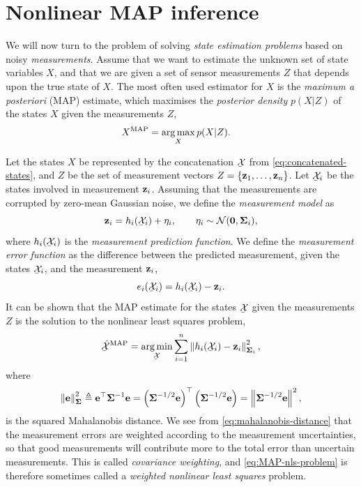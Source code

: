 \begin{example}[frametitle=Range-based localisation]
\end{example}

\section{Nonlinear MAP inference}
We will now turn to the problem of solving \emph{state estimation problems} based on noisy \emph{measurements}.
Assume that we want to estimate the unknown set of state variables $X$, and that we are given a set of sensor measurements $Z$ that depends upon the true state of $X$.
The most often used estimator for $X$ is the \emph{maximum a posteriori} (MAP) estimate, which maximises the \emph{posterior density} $p(X | Z)$ of the states $X$ given the measurements $Z$,
\begin{align} \label{eq:MAP}
    X^\text{MAP} &= \operatorname*{arg\,max}_X p(X | Z).
\end{align}

Let the states $X$ be represented by the concatenation $\ubar{\cX}$ from \eqref{eq:concatenated-states}, and $Z$ be the set of measurement vectors $Z = \{{\boldsymbol{\mathbf{z}}}_1, \ldots, {\boldsymbol{\mathbf{z}}}_n \}$.
Let $\ubar{\cX}_i$ be the states involved in measurement ${\boldsymbol{\mathbf{z}}}_i$.
Assuming that the measurements are corrupted by zero-mean Gaussian noise, we define the \emph{measurement model} as
\begin{equation}
  \vecz_i = h_i(\ubar{\cX}_i) + \eta_i, \qquad \eta_i \sim \cN(\matr{0}, \matSigma_i),
\end{equation}
where $h_i(\ubar{\cX}_i)$ is the \emph{measurement prediction function}.
We define the \emph{measurement error function} as the difference between the predicted measurement, given the states $\ubar{\cX}_i$, and the measurement ${\boldsymbol{\mathbf{z}}}_i$,
\begin{equation}
  e_i(\ubar{\cX}_i) = h_i(\ubar{\cX}_i) - \vecz_i.
\end{equation}
It can be shown that the MAP estimate for the states $\ubar{\cX}$ given the measurements $Z$ is the solution to the nonlinear least squares problem,
\begin{equation} \label{eq:MAP-nls-problem}
  \ubar{\hat{\cX}}^{\text{MAP}} = \argmin_{\ubar{\cX}} \sum_{i=1}^n \norm{h_i(\ubar{\cX}_i) - \vecz_i}^2_{\matSigma_i},
\end{equation}
where
\begin{equation} \label{eq:mahalanobis-distance}
  \left\lVert{\boldsymbol{\mathbf{e}}}\right\rVert^2_{{\boldsymbol{\mathbf{\Sigma}}}} \triangleq {\boldsymbol{\mathbf{e}}}^{\top} {\boldsymbol{\mathbf{\Sigma}}}^{-1} {\boldsymbol{\mathbf{e}}} = \left( {\boldsymbol{\mathbf{\Sigma}}}^{-1/2} {\boldsymbol{\mathbf{e}}} \right)^{\top} \left( {\boldsymbol{\mathbf{\Sigma}}}^{-1/2} {\boldsymbol{\mathbf{e}}} \right) = \left\lVert{\boldsymbol{\mathbf{\Sigma}}}^{-1/2} {\boldsymbol{\mathbf{e}}}\right\rVert^2,
\end{equation}
is the squared Mahalanobis distance. 
We see from \eqref{eq:mahalanobis-distance} that the measurement errors are weighted according to the measurement uncertainties, so that good measurements will contribute more to the total error than uncertain measurements.
This is called \emph{covariance weighting}, and \eqref{eq:MAP-nls-problem} is therefore sometimes called a \emph{weighted nonlinear least squares} problem.


